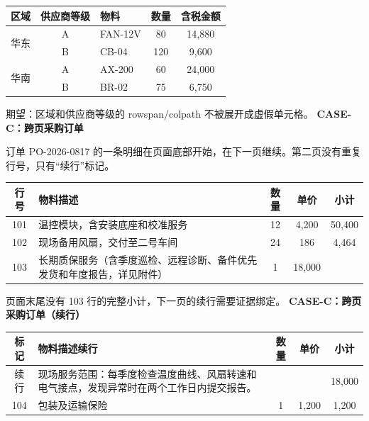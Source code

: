 \documentclass[10pt,a4paper]{article}
\begin{document}
\par\medskip\noindent\begin{tabular}{|c|c|p{42mm}|c|c|}\hline
\rowcolor{blue!12} 区域 & 供应商等级 & 物料 & 数量 & 含税金额\\\hline
\multirow{2}{*}{华东} & A & FAN-12V & 80 & 14,880\\\cline{2-5}
& B & CB-04 & 120 & 9,600\\\hline
\multirow{2}{*}{华南} & A & AX-200 & 60 & 24,000\\\cline{2-5}
& B & BR-02 & 75 & 6,750\\\hline
\end{tabular}
\vspace{7mm}\par\color{green!50!black}\small 期望：区域和供应商等级的 rowspan/colpath 不被展开成虚假单元格。
\newpage
{\fontsize{18}{22}\selectfont\bfseries CASE-C：跨页采购订单}\par\vspace{3mm}
订单 PO-2026-0817 的一条明细在页面底部开始，在下一页继续。第二页没有重复行号，只有“续行”标记。
\par\medskip\noindent\begin{tabular}{|c|p{55mm}|c|c|c|}\hline
\rowcolor{orange!18} 行号 & 物料描述 & 数量 & 单价 & 小计\\\hline
101 & 温控模块，含安装底座和校准服务 & 12 & 4,200 & 50,400\\\hline
102 & 现场备用风扇，交付至二号车间 & 24 & 186 & 4,464\\\hline
103 & 长期质保服务（含季度巡检、远程诊断、\newline 备件优先发货和年度报告，详见附件） & 1 & 18,000 & \\\hline
\end{tabular}
\vfill\color{orange!70!black}\small 页面末尾没有 103 行的完整小计，下一页的续行需要证据绑定。
\newpage
{\fontsize{18}{22}\selectfont\bfseries CASE-C：跨页采购订单（续行）}\par\vspace{4mm}
\par\medskip\noindent\begin{tabular}{|c|p{55mm}|c|c|c|}\hline
\rowcolor{orange!18} 标记 & 物料描述续行 & 数量 & 单价 & 小计\\\hline
续行 & 现场服务范围：每季度检查温度曲线、风扇转速和电气接点，发现异常时在两个工作日内提交报告。 &  &  & 18,000\\\hline
104 & 包装及运输保险 & 1 & 1,200 & 1,200\\\hline
\end{tabular}
\end{document}
